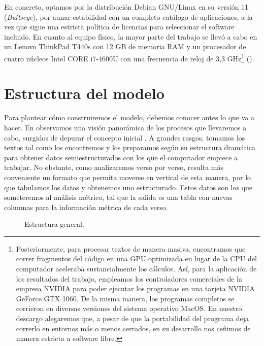 En concreto, optamos por la distribución Debian GNU/Linux \parencite*{debian2022} en su versión 11 (\textit{Bullseye}), por aunar estabilidad con un completo catálogo de aplicaciones, a la vez que sigue una estricta política de licencias para seleccionar el software incluido. En cuanto al equipo físico, la mayor parte del trabajo se llevó a cabo en un Lenovo ThinkPad T440s con 12 GB de memoria RAM y un procesador de cuatro núcleos Intel CORE i7-4600U con una frecuencia de reloj de 3{,}3 GHz\footnote{Posteriormente, para procesar textos de manera masiva, encontramos que correr fragmentos del código en una GPU optimizada en lugar de la CPU del computador aceleraba sustancialmente los cálculos. Así, para la aplicación de los resultados del trabajo, empleamos los controladores comerciales de la empresa NVIDIA para poder ejecutar los programas en una tarjeta NVIDIA GeForce GTX 1060. De la misma manera, los programas completos se corrieron en diversas versiones del sistema operativo MacOS. En nuestro descargo alegaremos que, a pesar de que la portabilidad del programa deja correrlo en entornos más o menos cerrados, en su desarrollo nos ceñimos de manera estricta a software libre.} ().


\section{Estructura del modelo}
Para plantear cómo construiremos el modelo, debemos conocer antes lo que va a hacer. En  observamos una visión panorámica de los procesos que llevaremos a cabo, surgidos de depurar el concepto inicial \parencite{sanz2023a}. A grandes rasgos, tomamos los textos tal como los encontremos y los preparamos según su estructura dramática para obtener datos semiestructurados con los que el computador empiece a trabajar. No obstante, como analizaremos verso por verso, resulta más conveniente un formato que permita moverse en vertical de esta manera, por lo que tabulamos los datos y obtenemos uno estructurado. Estos datos son los que someteremos al análisis métrico, tal que la salida es una tabla con nuevas columnas para la información métrica de cada verso.

\begin{figure}[!ht]
	\centering
		
	\caption{Estructura general.}
	\label{fig:estructura}
\end{figure}

